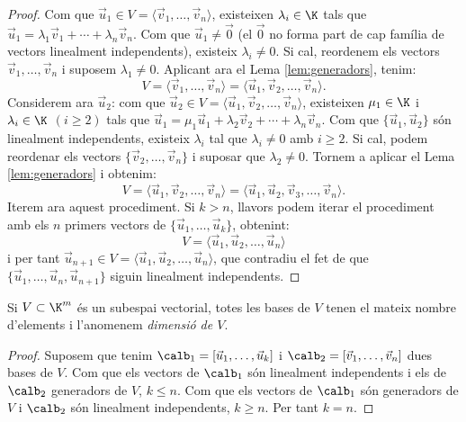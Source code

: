 \begin{proof}
    
    Com que $\vec u_1\in V=\langle \vec v_1,\dots,\vec v_n \rangle$, existeixen $\lambda_i\in\K$ tals que $\vec u_1=\lambda_1 \vec v_1+\cdots+\lambda_n\vec v_n$. Com que $\vec u_1 \neq\vec 0$ (el $\vec 0$ no forma part de cap família de vectors linealment independents), existeix $\lambda_i\neq 0$. Si cal, reordenem els vectors $\vec v_1,\dots,\vec v_n$ i suposem $\lambda_1\neq 0$. Aplicant ara el Lema \ref{lem:generadors}, tenim:
    $$
    V=\langle \vec v_1,\dots,\vec v_n \rangle=\langle \vec u_1,\vec v_2,\dots,\vec v_n \rangle .
    $$
    Considerem ara $\vec u_2$: com que  $\vec u_2\in V=\langle \vec u_1,\vec v_2,\dots,\vec v_n \rangle$, existeixen $\mu_1\in\K$ i $\lambda_i\in\K$ $(i\geq 2)$ tals que $\vec u_1=\mu_1\vec u_1+\lambda_2\vec v_2+\cdots+\lambda_n\vec v_n$. Com que $\{\vec u_1,\vec u_2\}$ són linealment independents, existeix $\lambda_i$ tal que $\lambda_i\neq 0$ amb $i\geq 2$. Si cal, podem reordenar els vectors $\{\vec v_2,\dots,\vec v_n\}$ i suposar que $\lambda_2\neq 0$. Tornem a aplicar el Lema \ref{lem:generadors} i obtenim:
    $$
    V=\langle \vec u_1,\vec v_2,\dots,\vec v_{n} \rangle=\langle \vec u_1,\vec u_2,\vec v_3,\dots,\vec v_{n} \rangle .
    $$
    Iterem ara aquest procediment. Si $k>n$, llavors podem iterar el procediment amb els $n$ primers vectors de $\{\vec u_1,\dots,\vec u_k\}$, obtenint:
    $$
    V=\langle \vec u_1,\vec u_2,\dots,\vec u_{n} \rangle
    $$
    i per tant $\vec u_{n+1} \in V=\langle \vec u_1,\vec u_2,\dots,\vec u_{n} \rangle$, que contradiu el fet de que $\{\vec u_1, \dots, \vec u_n,\vec u_{n+1}\}$ siguin linealment independents.
\end{proof}
\begin{teorema}
\label{teo:bases-igual-cardinalitat}
    Si $V\subset \K^m$ és un subespai vectorial, totes les bases de $V$ tenen el mateix nombre d'elements i l'anomenem \emph{dimensió de $V$}.
\end{teorema}
\begin{proof}
Suposem que tenim $\calb_1=[\vec u_1,\dots,\vec u_k]$ i $\calb_2=[\vec v_1,\dots,\vec v_n]$ dues bases de $V$. Com que els vectors de $\calb_1$ són linealment independents i els de $\calb_2$ generadors de $V$, $k\leq n$. Com que els vectors de $\calb_1$ són generadors de $V$ i $\calb_2$ són linealment independents, $k\geq n$. Per tant $k=n$.
\end{proof}
